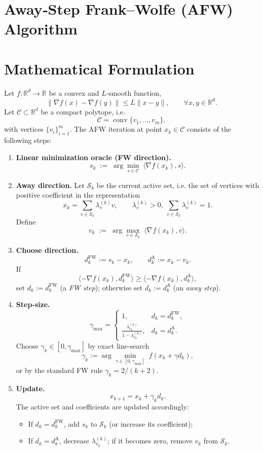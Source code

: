 \documentclass{article}
\begin{document}
\section*{Away‑Step Frank–Wolfe (AFW) Algorithm}

\section*{Mathematical Formulation}
Let $f:\mathbb{R}^d\to\mathbb{R}$ be a convex and $L$‑smooth function,
\[
\|\nabla f(x)-\nabla f(y)\|\le L\|x-y\|,\qquad\forall x,y\in\mathbb{R}^d .
\]
Let $\mathcal C\subset\mathbb{R}^d$ be a compact polytope, i.e.
\[
\mathcal C=\operatorname{conv}\{v_1,\dots ,v_m\},
\]
with vertices $\{v_i\}_{i=1}^m$.
The AFW iteration at point $x_k\in\mathcal C$ consists of the following steps:

\begin{enumerate}
\item \textbf{Linear minimization oracle (FW direction).}
\[
s_k \;:=\; \arg\min_{s\in\mathcal C}\;\langle\nabla f(x_k),s\rangle .
\]
\item \textbf{Away direction.} Let $\mathcal S_k$ be the current active set, i.e. the set of vertices with positive coefficient in the representation
\[
x_k=\sum_{v\in\mathcal S_k}\lambda_v^{(k)}v,\qquad \lambda_v^{(k)}>0,\ \sum_{v\in\mathcal S_k}\lambda_v^{(k)}=1 .
\]
Define
\[
v_k \;:=\; \arg\max_{v\in\mathcal S_k}\;\langle\nabla f(x_k),v\rangle .
\]
\item \textbf{Choose direction.}
\[
d_k^{\text{FW}}:=s_k-x_k,\qquad d_k^{\text{A}}:=x_k-v_k .
\]
If 
\[
\langle-\nabla f(x_k),d_k^{\text{FW}}\rangle\ge \langle-\nabla f(x_k),d_k^{\text{A}}\rangle,
\]
set $d_k:=d_k^{\text{FW}}$ (a \emph{FW step}); otherwise set $d_k:=d_k^{\text{A}}$ (an \emph{away step}).

\item \textbf{Step‑size.}
\[
\gamma_{\max}=
\begin{cases}
1, & d_k=d_k^{\text{FW}},\\[4pt]
\displaystyle\frac{\lambda_{v_k}^{(k)}}{1-\lambda_{v_k}^{(k)}}, & d_k=d_k^{\text{A}} .
\end{cases}
\]
Choose $\gamma_k\in[0,\gamma_{\max}]$ by exact line‑search
\[
\gamma_k:=\arg\min_{\gamma\in[0,\gamma_{\max}]}\;f(x_k+\gamma d_k),
\]
or by the standard FW rule $\gamma_k=2/(k+2)$.

\item \textbf{Update.}
\[
x_{k+1}=x_k+\gamma_k d_k .
\]
The active set and coefficients are updated accordingly:
\begin{itemize}
\item If $d_k=d_k^{\text{FW}}$, add $s_k$ to $\mathcal S_{k}$ (or increase its coefficient);
\item If $d_k=d_k^{\text{A}}$, decrease $\lambda_{v_k}^{(k)}$; if it becomes zero, remove $v_k$ from $\mathcal S_k$.
\end{itemize}
\end{enumerate}
\end{document}
